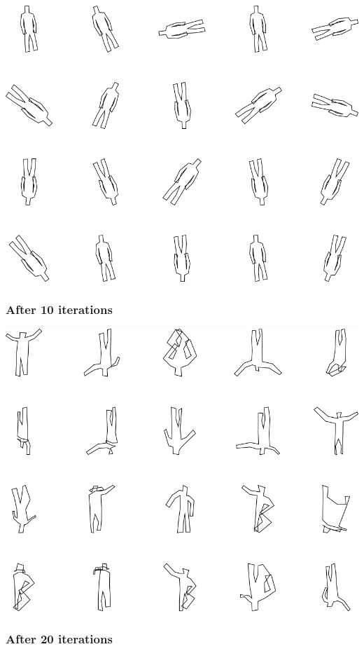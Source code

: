 \includegraphics[width=6in]{output/3.learning/full_tuning/full_tuning_iter0_.png}
\subsubsection{After 10 iterations}

\includegraphics[width=6in]{output/3.learning/full_tuning/full_tuning_iter10_.png}
\subsubsection{After 20 iterations}

